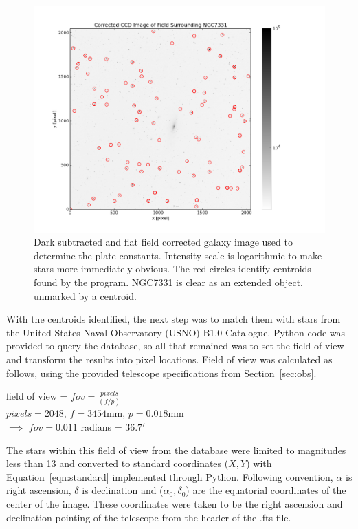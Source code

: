 \documentclass[a4paper,12pt]{article}
\begin{document}
\begin{figure}[!htbp]
\centering
\includegraphics[width = \linewidth]{NGC7331.png}
\caption{Dark subtracted and flat field corrected galaxy image used to determine the plate constants. Intensity scale is logarithmic to make stars more immediately obvious. The red circles identify centroids found by the program. NGC7331 is clear as an extended object, unmarked by a centroid.}
\label{fig:galaxy}
\end{figure}

With the centroids identified, the next step was to match them with stars from the United States Naval Observatory (USNO) B1.0 Catalogue. Python code was provided to query the database, so all that remained was to set the field of view and transform the results into pixel locations. Field of view was calculated as follows, using the provided telescope specifications from Section~\ref{sec:obs}.
\begin{center}
field of view = $fov = \frac{pixels}{(f/p)}$\\
$pixels = 2048$, $f = 3454$mm, $p = 0.018$mm\\
$\implies$ $fov = 0.011$ radians = $36.7'$
\end{center}

The stars within this field of view from the database were limited to magnitudes less than 13 and converted to standard coordinates ($X,Y$) with Equation~\ref{eqn:standard} implemented through Python. Following convention, $\alpha$ is right ascension, $\delta$ is declination and ($\alpha_{0},\delta_{0}$) are the equatorial coordinates of the center of the image. These coordinates were taken to be the right ascension and declination pointing of the telescope from the header of the .fts file.
\end{document}
